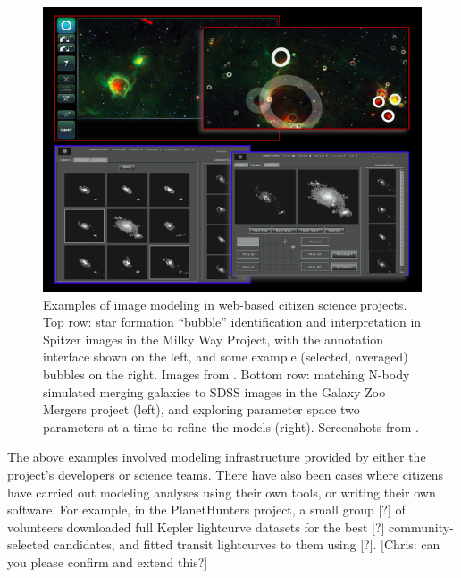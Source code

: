 \documentclass{ar2e}
\begin{document}
\begin{figure}[!ht]
\centering\includegraphics[width=\linewidth]{figs/modeling.png}
\caption{Examples of image modeling in web-based citizen science projects. Top
row: star formation ``bubble'' identification and interpretation in Spitzer
images in the Milky Way Project, with the annotation interface shown on the
left, and some example (selected, averaged) bubbles on the right. Images from
\citet{SimpsonEtal2012}. Bottom row: matching N-body simulated merging
galaxies to SDSS images in the Galaxy Zoo Mergers project (left), and
exploring parameter space two parameters at a time to refine the models
(right). Screenshots from \citet{HolincheckEtal2010}.}
\label{fig:modeling}
\end{figure}


The above examples involved modeling infrastructure provided by either the
project's developers or science teams. There have also been cases where
citizens have carried out modeling analyses using their own tools, or writing
their own software. For example, in the PlanetHunters project, a small group
[?] of volunteers downloaded full Kepler lightcurve datasets for the best [?]
community-selected candidates, and fitted transit lightcurves to them using
[?]. [Chris: can you please confirm and extend this?]
\end{document}
